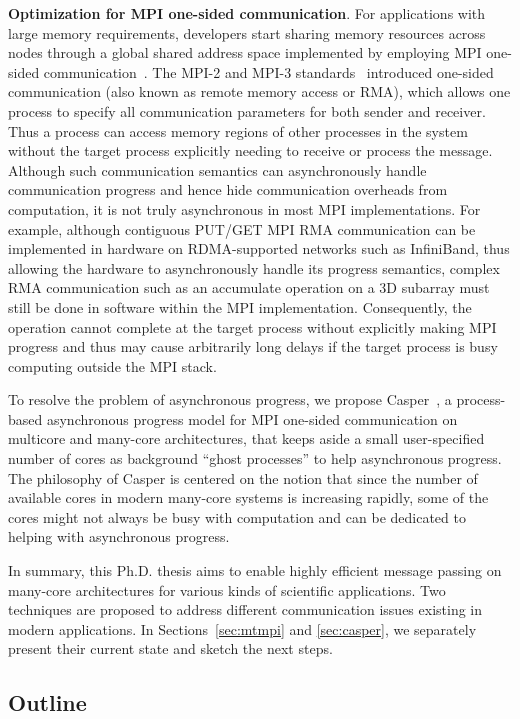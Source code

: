 \vspace{0.2ex}
\noindent\textbf{Optimization for MPI one-sided communication}.  For
applications with large memory requirements, developers start sharing
memory resources across nodes through a global shared address space
implemented by employing MPI one-sided
communication~\cite{dinan12:armci_mpi}.  The MPI-2 and MPI-3
standards~\cite{mpi30-report} introduced one-sided communication (also
known as remote memory access or RMA), which allows one process to
specify all communication parameters for both sender and receiver.
Thus a process can access memory regions of other processes in the
system without the target process explicitly needing to receive or
process the message. Although such communication semantics can
asynchronously handle communication progress and hence hide
communication overheads from computation, it is not truly asynchronous
in most MPI implementations. For example, although contiguous PUT/GET
MPI RMA communication can be implemented in hardware on RDMA-supported
networks such as InfiniBand, thus allowing the hardware to
asynchronously handle its progress semantics, complex RMA
communication such as an accumulate operation on a 3D subarray must
still be done in software within the MPI implementation.
Consequently, the operation cannot complete at the target process
without explicitly making MPI progress and thus may cause arbitrarily
long delays if the target process is busy computing outside the MPI
stack.

To resolve the problem of asynchronous progress, we propose
Casper~\cite{casper}, a process-based asynchronous progress model for
MPI one-sided communication on multicore and many-core architectures,
that keeps aside a small user-specified number of cores as background
``ghost processes'' to help asynchronous progress. The philosophy of
Casper is centered on the notion that since the number of available
cores in modern many-core systems is increasing rapidly, some of the
cores might not always be busy with computation and can be dedicated
to helping with asynchronous progress.

In summary, this Ph.D. thesis aims to enable highly efficient message
passing on many-core architectures for various kinds of scientific
applications. Two techniques are proposed to address different
communication issues existing in modern applications.  In
Sections~\ref{sec:mtmpi} and \ref{sec:casper}, we separately present
their current state and sketch the next steps.

\subsection{Outline}
